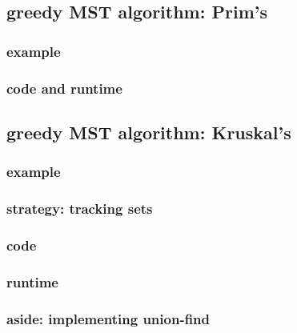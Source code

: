 

\subsection{greedy MST algorithm: Prim's}



\subsubsection{example}



\subsubsection{code and runtime}




\subsection{greedy MST algorithm: Kruskal's}



\subsubsection{example}



\subsubsection{strategy: tracking sets}



\subsubsection{code}



\subsubsection{runtime}



\subsubsection{aside: implementing union-find}



